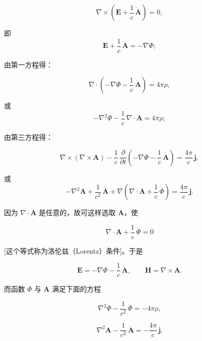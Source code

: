 \documentclass[11pt,a4paper,oneside]{ctexbook}
\newcommand{\ve}[1]{\bm{#1}}
\begin{document}
\begin{equation*}
\nabla \times \left(\ve{E} + \frac{1}{c}\, \dot{\ve{A}}\right) = 0,
\end{equation*}

即
\begin{equation*}
\ve{E} + \frac{1}{c}\, \dot{\ve{A}} = -\nabla\Phi;
\end{equation*}

由第一方程得：

\begin{equation*}
\nabla \cdot \left(-\nabla\Phi - \frac{1}{c}\, \dot{\ve{A}}\right) = 4\pi\rho,
\end{equation*}

或
\begin{equation*}
-\nabla^{2}\Phi - \frac{1}{c}\, \nabla \cdot \dot{\ve{A}} = 4\pi\rho;
\end{equation*}

由第三方程得：

\begin{equation*}
\nabla \times (\nabla \times \ve{A}) - \frac{1}{c}\, \frac{\partial}{\partial t}\left(-\nabla\Phi - \frac{1}{c}\, \dot{\ve{A}}\right) = \frac{4\pi}{c}\, \ve{j},
\end{equation*}

或
\begin{equation*}
-\nabla^{2}\ve{A} + \frac{1}{c^{2}}\, \ddot{\ve{A}} + \nabla\left(\nabla \cdot \ve{A} + \frac{1}{c}\, \dot{\Phi}\right) = \frac{4\pi}{c}\, \ve{j}.
\end{equation*}

因为 $\nabla \cdot \ve{A}$ 是任意的，故可这样选取 $\ve{A}$，使

\begin{equation*}
\nabla \cdot \ve{A} + \frac{1}{c}\, \dot{\Phi} = 0
\end{equation*}

[这个等式称为洛伦兹（Lorentz）条件]。于是

\begin{equation*}
\ve{E} = -\nabla\Phi - \frac{1}{c}\, \dot{\ve{A}}, \qquad \ve{H} = \nabla \times \ve{A}.
\end{equation*}

而函数 $\Phi$ 与 $\ve{A}$ 满足下面的方程

\begin{equation}
\nabla^{2}\Phi - \frac{1}{c^{2}}\, \ddot{\Phi} = -4\pi\rho,
\tag{1.60}
\end{equation}

\begin{equation*}
\nabla^{2}\ve{A} - \frac{1}{c^{2}}\, \ddot{\ve{A}} = -\frac{4\pi}{c}\, \ve{j}.
\end{equation*}
\end{document}
